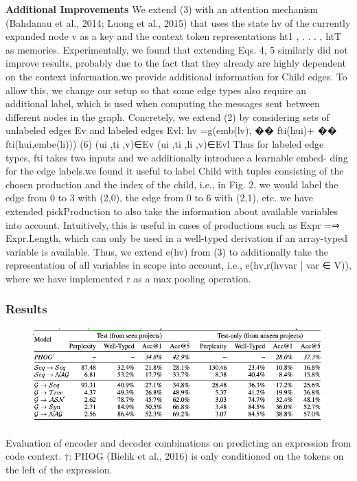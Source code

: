 \documentclass{article}
\begin{document}
\textbf{Additional Improvements} We extend (3) with an attention mechanism (Bahdanau et al., 2014; Luong et al., 2015) that uses the state hv of the currently expanded node v as a key and the context token representations ht1 , . . . , htT as memories. Experimentally, we found that extending Eqs. 4, 5 similarly did not improve results, probably due to the fact that they already are highly dependent on the context information.we provide additional information for Child edges. To allow this, we change our setup so that some edge types also require an additional label, which is used when computing the messages sent between different nodes in the graph. Concretely, we extend (2) by considering sets of unlabeled edges Ev and labeled edges Evl:
hv =g(emb(lv), �� fti(hui)+ �� fti(hui,embe(li))) (6) (ui ,ti ,v)∈Ev (ui ,ti ,li ,v)∈Evl
Thus for labeled edge types, fti takes two inputs and we additionally introduce a learnable embed- ding for the edge labels.we found it useful to label Child with tuples consisting of the chosen production and the index of the child, i.e., in Fig. 2, we would label the edge from 0 to 3 with (2,0), the edge from 0 to 6 with (2,1), etc. we have extended pickProduction to also take the information about available variables into account. Intuitively, this is useful in cases of productions such as Expr =⇒ Expr.Length, which can only be used in a well-typed derivation if an array-typed variable is available. Thus, we extend e(hv) from (3) to additionally take the representation of all variables in scope into account, i.e., e(hv,r({hvvar | var ∈ V})), where we have implemented r as a max pooling operation.
\subsubsection{Results}
\begin{figure}[ht]
\vskip 0.2in
\begin{center}
\centerline{\includegraphics[width=\columnwidth]{Images/Synthesis2-3.png}}
\label{icml-historical}
\end{center}
\vskip -0.2in
\end{figure}
Evaluation of encoder and decoder combinations on predicting an expression from code context. †: PHOG (Bielik et al., 2016) is only conditioned on the tokens on the left of the expression.
\end{document}
